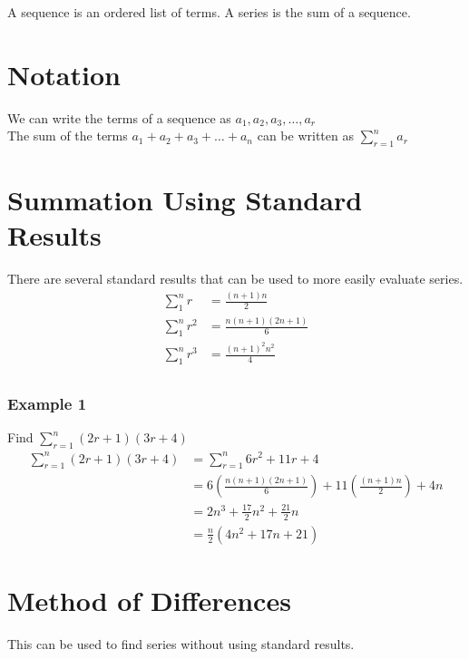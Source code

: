 \documentclass[class=article, crop=false]{standalone}
\begin{document}
A sequence is an ordered list of terms. A series is the sum of a sequence. 
\section*{Notation}
We can write the terms of a sequence as $a_1, a_2, a_3, \dots, a_r$ \\
The sum of the terms $a_1 + a_2 + a_3 + \dots + a_n$ can be written as $\sum_{r=1}^n a_r$ \\

\section*{Summation Using Standard Results}
There are several standard results that can be used to more easily evaluate series. \\
\begin{align*}
\sum_1^n r   & = \frac{(n+1)n}{2} \\
\sum_1^n r^2 & = \frac{n(n+1)(2n+1)}{6} \\
\sum_1^n r^3 & = \frac{(n+1)^2n^2}{4} \\
\end{align*}
\subsubsection*{Example 1}
Find $\sum^n_{r=1}(2r+1)(3r+4)$
\begin{align*}
\sum^n_{r=1}(2r+1)(3r+4) &= \sum^n_{r=1} 6r^2 + 11r + 4 \\
& = 6(\frac{n(n+1)(2n+1)}{6}) + 11(\frac{(n+1)n}{2}) + 4n \\
& = 2n^3 + \frac{17}{2}n^2 + \frac{21}{2} n \\
& = \frac{n}{2}(4n^2 + 17n + 21)
\end{align*}

\section*{Method of Differences}
This can be used to find series without using standard results. 
\end{document}
